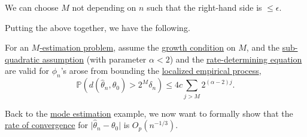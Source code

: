 \begin{remark}
	We can choose \(M\) not depending on \(n\) such that the right-hand side is \(\leq \epsilon \).
\end{remark}

Putting the above together, we have the following.
\begin{theorem}\label{thm:non-asymptotic-rate-of-convergence}
	For an \hyperref[prb:M-estimation]{\(M\)-estimation problem}, assume the \hyperref[def:growth-condition*]{growth condition} on \(M\), and the \hyperref[def:sub-quadratic-assumption]{sub-quadratic assumption} (with parameter \(\alpha < 2\)) and the \hyperref[def:rate-determining-equation]{rate-determining equation} are valid for \(\phi _n\)'s arose from bounding the \hyperref[def:localized-EP]{localized empirical process},
	\[
		\mathbb{P} (d(\hat{\theta} _n, \theta _0) > 2^M \delta _n) \leq 4c \sum_{j > M} 2^{(\alpha -2) j}.
	\]
\end{theorem}

Back to the \hyperref[eg:mode-estimation]{mode estimation} example, we now want to formally show that the \hyperref[def:rate-of-convergence]{rate of convergence} for \(\vert \hat{\theta} _n - \theta _0 \vert \) is \(O_p(n^{-1 / 3})\).

